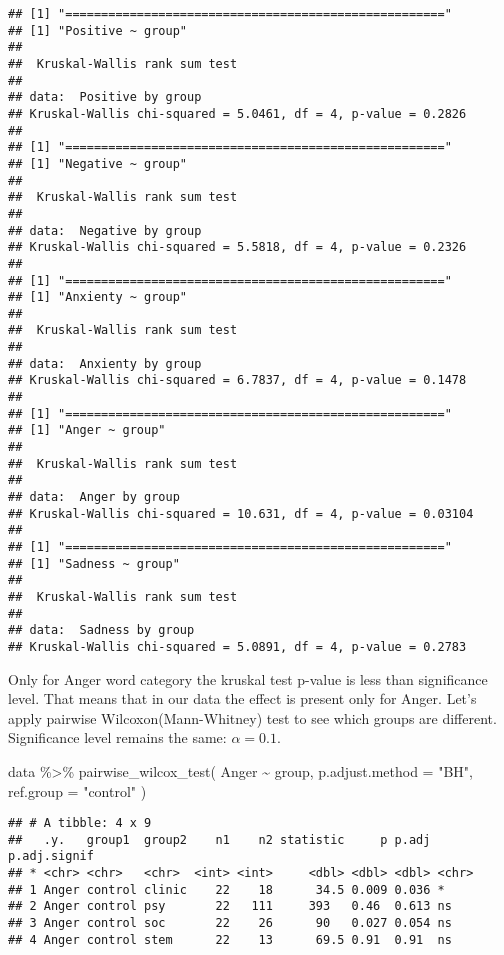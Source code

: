 \documentclass[
]{article}
\newenvironment{Shaded}{\begin{snugshade}}{\end{snugshade}}
\newcommand{\AttributeTok}[1]{\textcolor[rgb]{0.77,0.63,0.00}{#1}}
\newcommand{\FunctionTok}[1]{\textcolor[rgb]{0.00,0.00,0.00}{#1}}
\newcommand{\NormalTok}[1]{#1}
\newcommand{\SpecialCharTok}[1]{\textcolor[rgb]{0.00,0.00,0.00}{#1}}
\newcommand{\StringTok}[1]{\textcolor[rgb]{0.31,0.60,0.02}{#1}}
\begin{document}
\begin{verbatim}
## [1] "====================================================="
## [1] "Positive ~ group"
## 
##  Kruskal-Wallis rank sum test
## 
## data:  Positive by group
## Kruskal-Wallis chi-squared = 5.0461, df = 4, p-value = 0.2826
## 
## [1] "====================================================="
## [1] "Negative ~ group"
## 
##  Kruskal-Wallis rank sum test
## 
## data:  Negative by group
## Kruskal-Wallis chi-squared = 5.5818, df = 4, p-value = 0.2326
## 
## [1] "====================================================="
## [1] "Anxienty ~ group"
## 
##  Kruskal-Wallis rank sum test
## 
## data:  Anxienty by group
## Kruskal-Wallis chi-squared = 6.7837, df = 4, p-value = 0.1478
## 
## [1] "====================================================="
## [1] "Anger ~ group"
## 
##  Kruskal-Wallis rank sum test
## 
## data:  Anger by group
## Kruskal-Wallis chi-squared = 10.631, df = 4, p-value = 0.03104
## 
## [1] "====================================================="
## [1] "Sadness ~ group"
## 
##  Kruskal-Wallis rank sum test
## 
## data:  Sadness by group
## Kruskal-Wallis chi-squared = 5.0891, df = 4, p-value = 0.2783
\end{verbatim}

Only for Anger word category the kruskal test p-value is less than
significance level. That means that in our data the effect is present
only for Anger. Let's apply pairwise Wilcoxon(Mann-Whitney) test to see
which groups are different. Significance level remains the same:
\(\alpha = 0.1\).

\begin{Shaded}
\begin{Highlighting}[]
\NormalTok{data }\SpecialCharTok{\%\textgreater{}\%} \FunctionTok{pairwise\_wilcox\_test}\NormalTok{(}
\NormalTok{  Anger }\SpecialCharTok{\textasciitilde{}}\NormalTok{ group,}
  \AttributeTok{p.adjust.method =} \StringTok{"BH"}\NormalTok{,}
  \AttributeTok{ref.group =} \StringTok{"control"}
\NormalTok{)}
\end{Highlighting}
\end{Shaded}

\begin{verbatim}
## # A tibble: 4 x 9
##   .y.   group1  group2    n1    n2 statistic     p p.adj p.adj.signif
## * <chr> <chr>   <chr>  <int> <int>     <dbl> <dbl> <dbl> <chr>       
## 1 Anger control clinic    22    18      34.5 0.009 0.036 *           
## 2 Anger control psy       22   111     393   0.46  0.613 ns          
## 3 Anger control soc       22    26      90   0.027 0.054 ns          
## 4 Anger control stem      22    13      69.5 0.91  0.91  ns
\end{verbatim}
\end{document}
